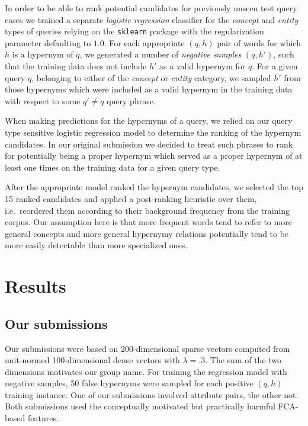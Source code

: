 \documentclass[11pt,a4paper]{article}
\begin{document}
In order to be able to rank potential candidates for previously unseen test
query cases we trained a separate \emph{logistic regression} classifier for the
\textit{concept} and \textit{entity} types of queries relying on the
\texttt{sklearn} package with the regularization parameter defaulting to $1.0$.
For each appropriate $(q,h)$ pair of words for which
$h$ is a hypernym of $q$, we generated a number of \emph{negative samples} $(q, h')$,
such that the training data does not include $h'$ as a valid hypernym for $q$.
For a given query $q$, belonging to either of the \textit{concept} or
\textit{entity} category, we sampled $h'$ from those hypernyms which were
included as a valid hypernym in the training data with respect to some $q' \neq
q$ query phrase.

When making predictions for the hypernyms of a query, we relied on our query
type sensitive logistic regression model to determine the ranking of the
hypernym candidates. In our original submission we decided to treat such
phrases to rank for potentially being a proper hypernym which served as a
proper hypernym of at least one times on the training data for a given query
type.

After the appropriate model ranked the hypernym candidates, we selected
the top 15 ranked candidates and applied a post-ranking heuristic over them,
i.e.~reordered them according to their background frequency from the training
corpus. Our assumption here is that more frequent words tend to refer to more
general concepts and more general hypernymy relations potentially tend to be
more easily detectable than more specialized ones.

\section{Results} \label{sec:results}

\subsection{Our submissions}

Our submissions were based on 200-dimensional sparse vectors computed from
unit-normed 100-dimensional dense vectors with $\lambda=.3$. The sum of the two
dimensions motivates our group name. For training the regression model with
negative samples, 50 false hypernyms were sampled for each positive $(q,h)$ 
training instance. One
of our submissions involved attribute pairs, the other not. Both
submissions used the conceptually motivated but practically harmful FCA-based
features.
\end{document}
